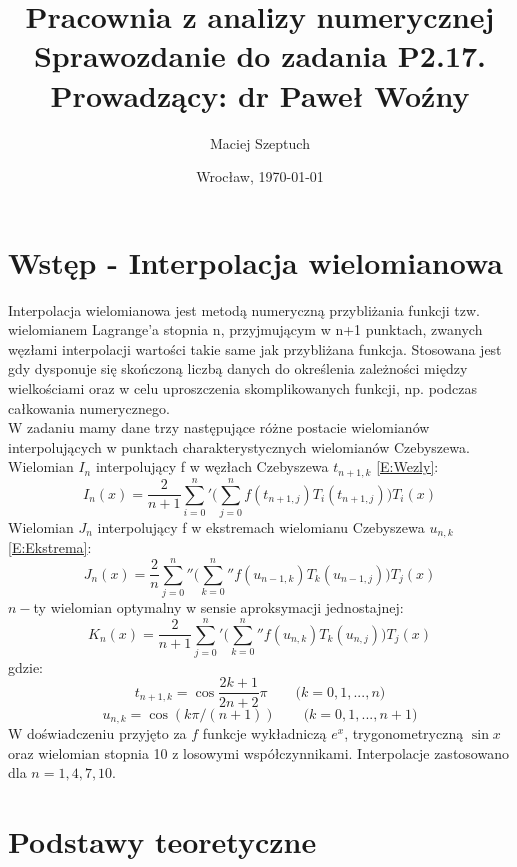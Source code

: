 \documentclass[11pt,leqno]{article}
\title{\LARGE \textbf{{Pracownia z analizy numerycznej}}\\
      {\Large Sprawozdanie do zadania \textbf{P2.17.}}\\
      {\large Prowadzący: dr Paweł Woźny}
}
\author{Maciej Szeptuch}
\date{Wrocław, \today}
\begin{document}
\thispagestyle{empty}
\maketitle

\section{Wstęp - Interpolacja wielomianowa}\label{S:Wstęp}
Interpolacja wielomianowa jest metodą numeryczną przybliżania funkcji tzw.
wielomianem Lagrange'a stopnia n, przyjmującym w n+1 punktach, zwanych
węzłami interpolacji wartości takie same jak przybliżana funkcja.
Stosowana jest gdy dysponuje się skończoną liczbą danych do określenia
zależności między wielkościami oraz w celu uproszczenia skomplikowanych
funkcji, np. podczas całkowania numerycznego.\\
W zadaniu mamy dane trzy następujące różne postacie wielomianów interpolujących
w punktach charakterystycznych wielomianów Czebyszewa.\\
Wielomian $I_n$ interpolujący f w węzłach Czebyszewa $t_{n+1,k}$ \eqref{E:Wezly}:
\begin{equation}
    I_n(x) = \frac{2}{n+1}\sum_{i=0}^{n}'\Big(\sum_{j=0}^nf(t_{n+1,j})T_i(t_{n+1,j})\Big)T_i(x)
\end{equation}
Wielomian $J_n$ interpolujący f w ekstremach wielomianu Czebyszewa $u_{n,k}$\eqref{E:Ekstrema}:
\begin{equation}
    J_n(x) = \frac{2}{n}\sum_{j=0}^{n}''\Big(\sum_{k=0}^n''f(u_{n-1,k})T_k(u_{n-1,j})\Big)T_j(x)
\end{equation}
$n-$ty wielomian optymalny w sensie aproksymacji jednostajnej:
\begin{equation}
    K_n(x) = \frac{2}{n+1}\sum_{j=0}^{n}'\Big(\sum_{k=0}^n''f(u_{n,k})T_k(u_{n,j})\Big)T_j(x)
\end{equation}
gdzie:
\begin{equation}\label{E:Wezly}
    t_{n+1,k} = \cos\frac{2k+1}{2n+2}\pi \qquad\mbox{($k = 0,1,...,n$)}
\end{equation}
\begin{equation}\label{E:Ekstrema}
    u_{n,k} = \cos(k\pi/(n+1)) \qquad\mbox{($k = 0,1,...,n+1$)}
\end{equation}
W doświadczeniu przyjęto za $f$ funkcje wykładniczą $e^x$, trygonometryczną $\sin x$
oraz wielomian stopnia 10 z losowymi współczynnikami. Interpolacje zastosowano dla $n = 1, 4, 7, 10$.

\section{Podstawy teoretyczne}
\end{document}
